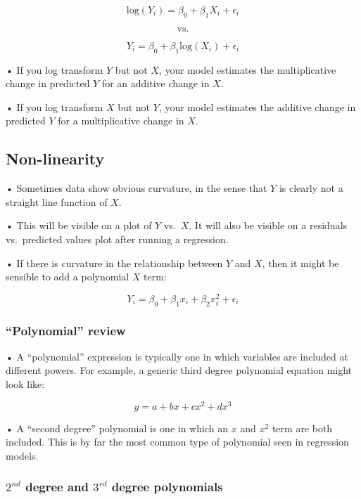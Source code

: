 \documentclass[
  letterpaper,
  DIV=11,
  numbers=noendperiod]{scrreprt}
\begin{document}
\[
\text{log}(Y_i) = \beta_0 + \beta_1X_i + \epsilon_i
\]

\[
\text{vs.}
\]

\[
Y_i = \beta_0 + \beta_1\text{log}(X_i) + \epsilon_i
\]

• If you log transform \(Y\) but not \(X\), your model estimates the
multiplicative change in predicted \(Y\) for an additive change in
\(X\).

• If you log transform \(X\) but not \(Y\), your model estimates the
additive change in predicted \(Y\) for a multiplicative change in \(X\).

\hypertarget{non-linearity}{%
\subsection{Non-linearity}\label{non-linearity}}

• Sometimes data show obvious curvature, in the sense that \(Y\) is
clearly not a straight line function of \(X\).

• This will be visible on a plot of \(Y\) vs.~\(X\). It will also be
visible on a residuals vs.~predicted values plot after running a
regression.

• If there is curvature in the relationship between \(Y\) and \(X\),
then it might be sensible to add a polynomial \(X\) term:

\[
Y_i = \beta_0 + \beta_1x_i + \beta_2x_i^2 + \epsilon_i
\]

\hypertarget{polynomial-review}{%
\subsubsection{``Polynomial'' review}\label{polynomial-review}}

• A ``polynomial'' expression is typically one in which variables are
included at different powers. For example, a generic third degree
polynomial equation might look like:

\[
y = a + bx + cx^2 + dx^3
\]

• A ``second degree'' polynomial is one in which an \(x\) and \(x^2\)
term are both included. This is by far the most common type of
polynomial seen in regression models.

\hypertarget{nd-degree-and-3rd-degree-polynomials}{%
\subsubsection{\texorpdfstring{\(2^{nd}\) degree and \(3^{rd}\) degree
polynomials}{2\^{}\{nd\} degree and 3\^{}\{rd\} degree polynomials}}\label{nd-degree-and-3rd-degree-polynomials}}
\end{document}
